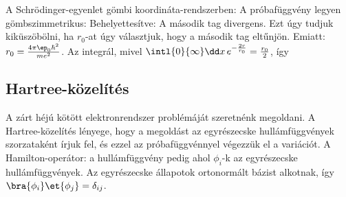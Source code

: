    A Schrödinger-egyenlet gömbi koordináta-rendszerben:
   A próbafüggvény legyen gömbszimmetrikus:
   Behelyettesítve:
   A második tag divergens.
   Ezt úgy tudjuk kiküszöbölni, ha $r_0$-at úgy választjuk, hogy a második tag eltűnjön.
   Emiatt: $r_0=\frac{4\pi\ep_0\hbar^2}{me^2}$.
   Az integrál, mivel $\intl{0}{\infty}\dd x\,e^{-\frac{2r}{r_0}}=\frac{r_0}{2}$, így
   
  \subsection{Hartree-közelítés}\label{ss:10-Hartree}
   
   A zárt héjú kötött elektronrendszer problémáját szeretnénk megoldani.
   A Hartree-közelítés lényege, hogy a megoldást az egyrészecske hullámfüggvények szorzataként írjuk fel, és ezzel az próbafüggvénnyel végezzük el a variációt.
   A Hamilton-operátor:
   a hullámfüggvény pedig 
   ahol $\phi_i$-k az egyrészecske hullámfüggvények.
   Az egyrészecske állapotok ortonormált bázist alkotnak, így $\bra{\phi_i}\et{\phi_j}=\delta_{ij}$.
   
